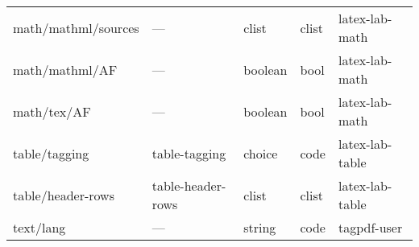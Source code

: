 \begin{tabular}{lllll}
math/mathml/sources &---           & clist           &clist &latex-lab-math\\
math/mathml/AF      &---           &boolean          &bool  &latex-lab-math\\
math/tex/AF       & ---            &boolean          &bool  &latex-lab-math\\[4pt]\midrule
table/tagging     & table-tagging  &choice           &code  &latex-lab-table\\
table/header-rows & table-header-rows& clist         &clist &latex-lab-table\\[4pt]\midrule
text/lang         & ---             & string         & code &tagpdf-user  \\
\bottomrule
\end{tabular}
